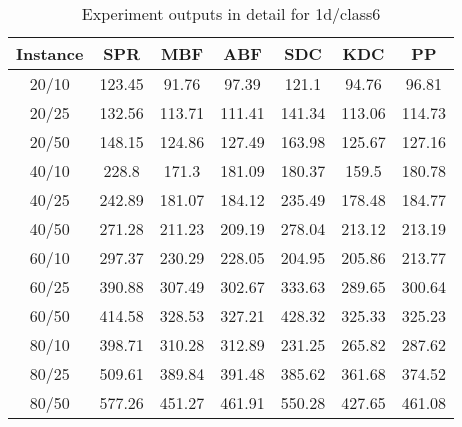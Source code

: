 \begin{table}[ht!]
    \caption{Experiment outputs in detail for 1d/class6}
    \centering
    \begin{tabular}{@{}ccccccc@{}}
        \toprule
        {\bfseries Instance} & {\bfseries SPR} & {\bfseries MBF}
        & {\bfseries ABF} & {\bfseries SDC} & {\bfseries KDC} & {\bfseries PP}\\
        \midrule
        20/10 & 123.45 & 91.76 & 97.39 & 121.1 & 94.76 & 96.81\\
        20/25 & 132.56 & 113.71 & 111.41 & 141.34 & 113.06 & 114.73\\
        20/50 & 148.15 & 124.86 & 127.49 & 163.98 & 125.67 & 127.16\\
        40/10 & 228.8 & 171.3 & 181.09 & 180.37 & 159.5 & 180.78\\
        40/25 & 242.89 & 181.07 & 184.12 & 235.49 & 178.48 & 184.77\\
        40/50 & 271.28 & 211.23 & 209.19 & 278.04 & 213.12 & 213.19\\
        60/10 & 297.37 & 230.29 & 228.05 & 204.95 & 205.86 & 213.77\\
        60/25 & 390.88 & 307.49 & 302.67 & 333.63 & 289.65 & 300.64\\
        60/50 & 414.58 & 328.53 & 327.21 & 428.32 & 325.33 & 325.23\\
        80/10 & 398.71 & 310.28 & 312.89 & 231.25 & 265.82 & 287.62\\
        80/25 & 509.61 & 389.84 & 391.48 & 385.62 & 361.68 & 374.52\\
        80/50 & 577.26 & 451.27 & 461.91 & 550.28 & 427.65 & 461.08\\
        \bottomrule
    \end{tabular}
\end{table}